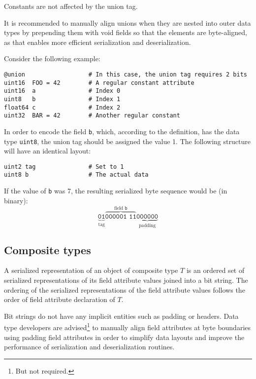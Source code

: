 Constants are not affected by the union tag.

It is recommended to manually align unions when they are nested into outer data types by
prepending them with void fields so that the elements are byte-aligned,
as that enables more efficient serialization and deserialization.

Consider the following example:

\begin{verbatim}
@union                  # In this case, the union tag requires 2 bits
uint16  FOO = 42        # A regular constant attribute
uint16  a               # Index 0
uint8   b               # Index 1
float64 c               # Index 2
uint32  BAR = 42        # Another regular constant
\end{verbatim}

In order to encode the field \verb|b|, which, according to the definition,
has the data type \verb|uint8|, the union tag should be assigned the value 1.
The following structure will have an identical layout:

\begin{verbatim}
uint2 tag               # Set to 1
uint8 b                 # The actual data
\end{verbatim}

If the value of \verb|b| was 7, the resulting serialized byte sequence would be (in binary):
$$%
\underbrace{\texttt{01}}_{\text{tag}}%
\overbrace{\texttt{000001 11}}^{\text{field }\texttt{b}}%
\underbrace{\texttt{000000}}_{\text{padding}}%
$$

\subsection{Composite types}

A serialized representation of an object of composite type $T$ is an ordered set of serialized representations of
its field attribute values joined into a bit string.
The ordering of the serialized representations of the field attribute values follows the order
of field attribute declaration of $T$.

Bit strings do not have any implicit entities such as padding or headers.
Data type developers are advised\footnote{But not required.} to manually align field attributes at
byte boundaries using padding field attributes in order to simplify data layouts
and improve the performance of serialization and deserialization routines.

